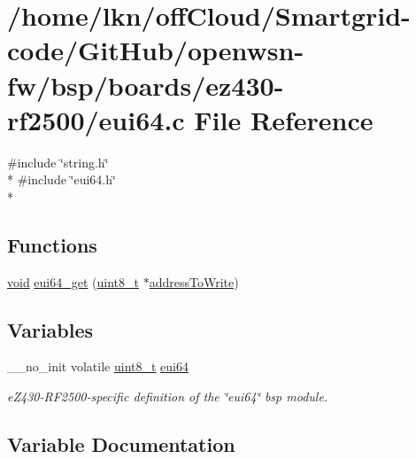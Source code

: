 \hypertarget{ez430-rf2500_2eui64_8c}{}\section{/home/lkn/off\+Cloud/\+Smartgrid-\/code/\+Git\+Hub/openwsn-\/fw/bsp/boards/ez430-\/rf2500/eui64.c File Reference}
\label{ez430-rf2500_2eui64_8c}
{\ttfamily \#include \char`\"{}string.\+h\char`\"{}}\\*
{\ttfamily \#include \char`\"{}eui64.\+h\char`\"{}}\\*
\subsection*{Functions}
\begin{DoxyCompactItemize}
\item 
\hyperlink{usb__devapi_8h_afabf60e7f57651d6d595a02c75f07cd0}{void} \hyperlink{group__eui64_gae49dc9068e3f46bfd188579192fc036b}{eui64\+\_\+get} (\hyperlink{_p_e___types_8h_aba7bc1797add20fe3efdf37ced1182c5}{uint8\+\_\+t} $\ast$\hyperlink{samr21__xpro_201bsp__flash_201bsp__flash_8c_a1f7d4f7dc49d64e8ffe1ff2e385657e5}{address\+To\+Write})
\end{DoxyCompactItemize}
\subsection*{Variables}
\begin{DoxyCompactItemize}
\item 
\+\_\+\+\_\+no\+\_\+init volatile \hyperlink{_p_e___types_8h_aba7bc1797add20fe3efdf37ced1182c5}{uint8\+\_\+t} \hyperlink{ez430-rf2500_2eui64_8c_a574bc0e8cd65bb0a8c6d40826901ba4e}{eui64}
\begin{DoxyCompactList}\small\item\em e\+Z430-\/\+R\+F2500-\/specific definition of the \char`\"{}eui64\char`\"{} bsp module. \end{DoxyCompactList}\end{DoxyCompactItemize}


\subsection{Variable Documentation}
